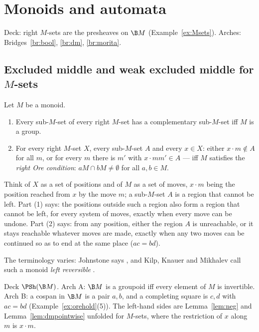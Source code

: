 \section{Monoids and automata}\label{sec:monoids}

Deck: right $M$-sets are the presheaves on $\B M$ (Example~\ref{ex:Msets}). Arches: Bridges~\ref{br:bool}, \ref{br:dm}, \ref{br:morita}.

\subsection{Excluded middle and weak excluded middle for $M$-sets}

\begin{theorem}\label{th:monoid}
Let $M$ be a monoid.
\begin{enumerate}
\item Every sub-$M$-set of every right $M$-set has a complementary sub-$M$-set iff $M$ is a group.
\item For every right $M$-set $X$, every sub-$M$-set $A$ and every $x\in X$: either $x\cdot m\notin A$ for all $m$, or for every $m$ there is $m'$ with $x\cdot mm'\in A$ --- iff $M$ satisfies the \emph{right Ore condition}: $aM\cap bM\neq\emptyset$ for all $a,b\in M$.
\end{enumerate}
\end{theorem}

\inwords{} Think of $X$ as a set of positions and of $M$ as a set of moves, $x\cdot m$ being the position reached from $x$ by the move $m$; a sub-$M$-set $A$ is a region that cannot be left. Part (1) says: the positions outside such a region also form a region that cannot be left, for every system of moves, exactly when every move can be undone. Part (2) says: from any position, either the region $A$ is unreachable, or it stays reachable whatever moves are made, exactly when any two moves can be continued so as to end at the same place ($ac = bd$).

The terminology varies: Johnstone says , and Kilp, Knauer and Mikhalev call such a monoid \emph{left reversible} \cite{hemelaer-rogers}.

\gen{} Deck $\PSh(\B M)$. Arch A: $\B M$ is a groupoid iff every element of $M$ is invertible. Arch B: a cospan in $\B M$ is a pair $a,b$, and a completing square is $c,d$ with $ac = bd$ (Example~\ref{ex:orehold}(5)). The left-hand sides are Lemma~\ref{lem:neg} and Lemma~\ref{lem:dmpointwise} unfolded for $M$-sets, where the restriction of $x$ along $m$ is $x\cdot m$.

